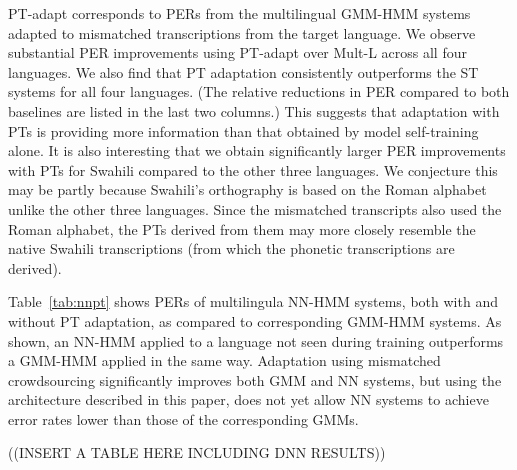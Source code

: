 {\sc PT-adapt} corresponds to PERs from the multilingual GMM-HMM
systems adapted to mismatched transcriptions from the target
language. We observe substantial PER improvements using {\sc PT-adapt}
over {\sc Mult-L} across all four languages. We also find that PT
adaptation consistently outperforms the {\sc ST} systems for all four
languages. (The relative reductions in PER compared to both baselines
are listed in the last two columns.) This suggests that adaptation
with PTs is providing more information than that obtained by model
self-training alone. It is also interesting that we obtain
significantly larger PER improvements with PTs for Swahili compared to
the other three languages. We conjecture this may be partly because
Swahili's orthography is based on the Roman alphabet unlike the other
three languages. Since the mismatched transcripts also used the Roman
alphabet, the PTs derived from them may more closely resemble the
native Swahili transcriptions (from which the phonetic transcriptions
are derived).

Table~\ref{tab:nnpt} shows PERs of multilingula NN-HMM systems,
both with and without PT adaptation, as compared to corresponding
GMM-HMM systems.  As shown, an NN-HMM applied to a language not seen
during training outperforms a GMM-HMM applied in the same way.
Adaptation using mismatched crowdsourcing significantly improves both
GMM and NN systems, but using the architecture described in this
paper, does not yet allow NN systems to achieve error rates lower than
those of the corresponding GMMs.

((INSERT A TABLE HERE INCLUDING DNN RESULTS))

